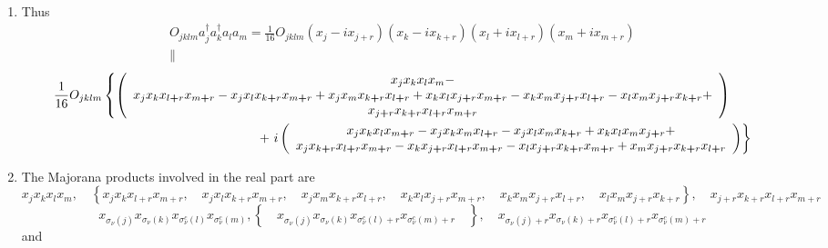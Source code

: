 \documentclass[aps,preprint]{revtex4}%
\begin{document}
\begin{enumerate}
\item Thus
\begin{gather}
O_{jklm}a_{j}^{\dagger}a_{k}^{\dagger}a_{l}a_{m}=\frac{1}{16}O_{jklm}%
(x_{j}-ix_{j+r})(x_{k}-ix_{k+r})(x_{l}+ix_{l+r})(x_{m}+ix_{m+r})\\
\parallel
\end{gather}%
\begin{align}
&  \frac{1}{16}O_{jklm}\left\{  \left(
\begin{array}
[c]{c}%
x_{j}x_{k}x_{l}x_{m}-\\
x_{j}x_{k}x_{l\boldsymbol{+}r}x_{m\boldsymbol{+}r}-x_{j}x_{l}%
x_{k\boldsymbol{+}r}x_{m\boldsymbol{+}r}+x_{j}x_{m}x_{k\boldsymbol{+}%
r}x_{l\boldsymbol{+}r}+x_{k}x_{l}x_{j\boldsymbol{+}r}x_{m\boldsymbol{+}%
r}-x_{k}x_{m}x_{j\boldsymbol{+}r}x_{l\boldsymbol{+}r}-x_{l}x_{m}%
x_{j\boldsymbol{+}r}x_{k\boldsymbol{+}r}+\\
x_{j\boldsymbol{+}r}x_{k\boldsymbol{+}r}x_{l\boldsymbol{+}r}x_{m\boldsymbol{+}%
r}%
\end{array}
\right)  \right. \\
&  \qquad\qquad\qquad\qquad\qquad\qquad\qquad\qquad+\left.  i\left(
\begin{array}
[c]{c}%
x_{j}x_{k}x_{l}x_{m\boldsymbol{+}r}-x_{j}x_{k}x_{m}x_{l\boldsymbol{+}r}%
-x_{j}x_{l}x_{m}x_{k\boldsymbol{+}r}+x_{k}x_{l}x_{m}x_{j\boldsymbol{+}r}+\\
x_{j}x_{k\boldsymbol{+}r}x_{l\boldsymbol{+}r}x_{m\boldsymbol{+}r}%
-x_{k}x_{j\boldsymbol{+}r}x_{l\boldsymbol{+}r}x_{m\boldsymbol{+}r}%
-x_{l}x_{j\boldsymbol{+}r}x_{k\boldsymbol{+}r}x_{m\boldsymbol{+}r}%
+x_{m}x_{j\boldsymbol{+}r}x_{k\boldsymbol{+}r}x_{l\boldsymbol{+}r}%
\end{array}
\right)  \right\}
\end{align}


\item The Majorana products involved in the real part are
\begin{equation}
x_{j}x_{k}x_{l}x_{m},\quad\left\{  \overset{}{x_{j}x_{k}x_{l+r}x_{m+r},\quad
x_{j}x_{l}x_{k+r}x_{m+r},\quad x_{j}x_{m}x_{k+r}x_{l+r},\quad x_{k}%
x_{l}x_{j+r}x_{m+r},\quad x_{k}x_{m}x_{j+r}x_{l+r},\quad x_{l}x_{m}%
x_{j+r}x_{k+r}}\right\}  ,\quad x_{j+r}x_{k+r}x_{l+r}x_{m+r}%
\end{equation}%
\begin{equation}
x_{\sigma_{\nu}\left(  j\right)  }x_{\sigma_{\nu}\left(  k\right)  }%
x_{\sigma_{\nu}^{c}\left(  l\right)  }x_{\sigma_{\nu}^{c}\left(  m\right)
},\left\{  \quad x_{\sigma_{\nu}\left(  j\right)  }x_{\sigma_{\nu}\left(
k\right)  }x_{\sigma_{\nu}^{c}\left(  l\right)  +r}x_{\sigma_{\nu}^{c}\left(
m\right)  +r}\quad\right\}  ,\quad x_{\sigma_{\nu}\left(  j\right)
+r}x_{\sigma_{\nu}\left(  k\right)  +r}x_{\sigma_{\nu}^{c}\left(  l\right)
+r}x_{\sigma_{\nu}^{c}\left(  m\right)  +r}%
\end{equation}
and


\end{enumerate}
\end{document}
